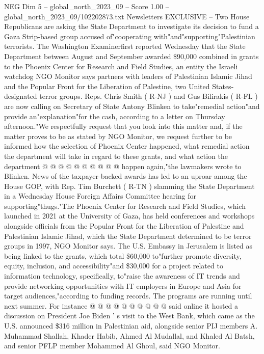 \begin{textsample}{NEG Dim 5 – global\_north\_2023\_09 – Score 1.00 – global\_north\_2023\_09/102202873.txt}  \label{ex:f5_neg_014}
Newsletters EXCLUSIVE -- Two House Republicans are asking the State Department to investigate its decision to fund a Gaza Strip-based group accused of"cooperating with"and"supporting"Palestinian terrorists.
The Washington Examinerfirst reported Wednesday that the State Department between August and September awarded \$90,000 combined in grants to the Phoenix Center for Research and Field Studies, an entity the Israeli watchdog NGO Monitor says partners with leaders of Palestinian Islamic Jihad and the Popular Front for the Liberation of Palestine, two United States-designated terror groups.
Reps.
Chris Smith ( R-NJ ) and Gus Bilirakis ( R-FL ) are now calling on Secretary of State Antony Blinken to take"remedial action"and provide an"explanation"for the cash, according to a letter on Thursday afternoon."We respectfully request that you look into this matter and, if the matter proves to be as stated by NGO Monitor, we request further to be informed how the selection of Phoenix Center happened, what remedial action the department will take in regard to these grants, and what action the department @ @ @ @ @ @ @ @ @ @ happen again,"the lawmakers wrote to Blinken.
News of the taxpayer-backed awards has led to an uproar among the House GOP, with Rep.
Tim Burchett ( R-TN ) slamming the State Department in a Wednesday House Foreign Affairs Committee hearing for supporting"thugs."The Phoenix Center for Research and Field Studies, which launched in 2021 at the University of Gaza, has held conferences and workshops alongside officials from the Popular Front for the Liberation of Palestine and Palestinian Islamic Jihad, which the State Department determined to be terror groups in 1997, NGO Monitor says.
The U.S.
Embassy in Jerusalem is listed as being linked to the grants, which total \$60,000 to"further promote diversity, equity, inclusion, and accessibility"and \$30,000 for a project related to information technology, specifically, to"raise the awareness of IT trends and provide networking opportunities with IT employers in Europe and Asia for target audiences,"according to funding records.
The programs are running until next summer.
For instance @ @ @ @ @ @ @ @ @ @ said online it hosted a discussion on President Joe Biden ' s visit to the West Bank, which came as the U.S. announced \$316 million in Palestinian aid, alongside senior PIJ members A.
Muhammad Shallah, Khader Habib, Ahmed Al Mudallal, and Khaled Al Batsh, and senior PFLP member Mohammed Al Ghoul, said NGO Monitor.

\end{textsample}
